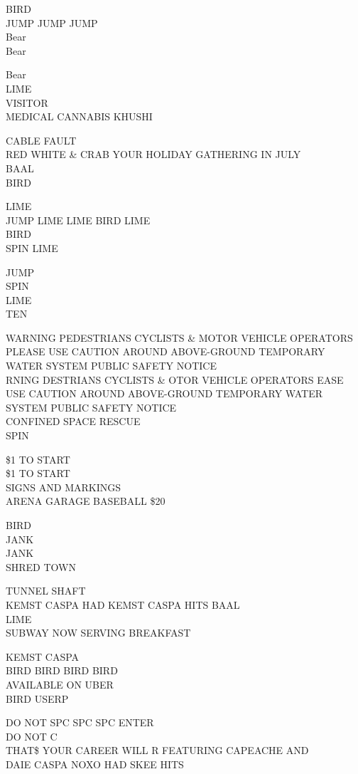 \documentclass[10pt,letterpaper]{article}
\begin{document}
BIRD\\
JUMP JUMP JUMP\\
Bear\\
Bear

Bear\\
LIME\\
VISITOR\\
MEDICAL CANNABIS KHUSHI

CABLE FAULT\\
RED WHITE \& CRAB YOUR HOLIDAY GATHERING IN JULY\\
BAAL\\
BIRD

LIME\\
JUMP LIME LIME BIRD LIME\\
BIRD\\
SPIN LIME

JUMP\\
SPIN\\
LIME\\
TEN

WARNING PEDESTRIANS CYCLISTS \& MOTOR VEHICLE OPERATORS PLEASE USE CAUTION AROUND ABOVE{-}GROUND TEMPORARY WATER SYSTEM PUBLIC SAFETY NOTICE\\
RNING DESTRIANS CYCLISTS \& OTOR VEHICLE OPERATORS EASE USE CAUTION AROUND ABOVE{-}GROUND TEMPORARY WATER SYSTEM PUBLIC SAFETY NOTICE\\
CONFINED SPACE RESCUE\\
SPIN

\$1 TO START\\
\$1 TO START\\
SIGNS AND MARKINGS\\
ARENA GARAGE BASEBALL \$20

BIRD\\
JANK\\
JANK\\
SHRED TOWN

TUNNEL SHAFT\\
KEMST CASPA HAD KEMST CASPA HITS BAAL\\
LIME\\
SUBWAY NOW SERVING BREAKFAST

KEMST CASPA\\
BIRD BIRD BIRD BIRD\\
AVAILABLE ON UBER\\
BIRD USERP

DO NOT SPC SPC SPC ENTER\\
DO NOT C\\
THAT\$ YOUR CAREER WILL R FEATURING CAPEACHE AND\\
DAIE CASPA NOXO HAD SKEE HITS
\end{document}
